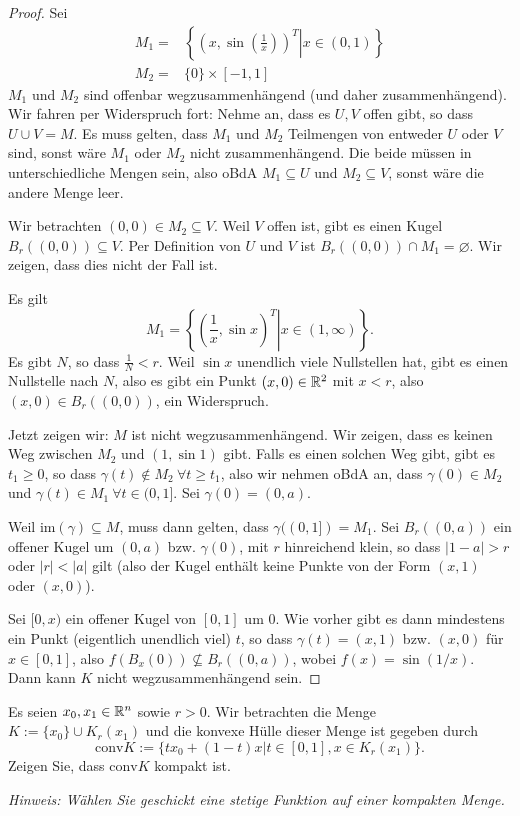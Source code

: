 \begin{proof}
	Sei
	\begin{align*}
		M_1=&\left\{ \left.\left( x,\sin\left( \frac{1}{x} \right)\right)^T \right|x\in (0,1)   \right\}\\
			M_2=& \{0\} \times [-1,1]\
	\end{align*}
	$M_1$ und $M_2$ sind offenbar wegzusammenhängend (und daher zusammenhängend). Wir fahren per Widerspruch fort: Nehme an, dass es $U,V$ offen gibt, so dass $U\cup V=M$. Es muss gelten, dass $M_1$ und $M_2$ Teilmengen von entweder $U$ oder $V$ sind, sonst wäre $M_1$ oder $M_2$ nicht zusammenhängend. Die beide müssen in unterschiedliche Mengen sein, also oBdA $M_1\subseteq U$ und $M_2\subseteq V$, sonst wäre die andere Menge leer.

	Wir betrachten $(0,0)\in M_2\subseteq V$. Weil $V$ offen ist, gibt es einen Kugel $B_r((0,0))\subseteq V$. Per Definition von $U$ und $V$ ist $B_r((0,0))\cap M_1=\varnothing$. Wir zeigen, dass dies nicht der Fall ist.
	
	Es gilt
	\[
	M_1=\left\{\left.\left( \frac{1}{x},\sin x \right)^T\right| x\in (1,\infty) \right\} 
	.\] 
	Es gibt $N$, so dass $\frac{1}{N}<r$. Weil $\sin x$ unendlich viele Nullstellen hat, gibt es einen Nullstelle nach $N$, also es gibt ein Punkt $(x,0)\in \mathbb{R}^2$ mit $x<r$, also $(x,0)\in B_r((0,0))$, ein Widerspruch.

	Jetzt zeigen wir: $M$ ist nicht wegzusammenhängend. Wir zeigen, dass es keinen Weg zwischen $M_2$ und $(1,\sin 1)$ gibt. Falls es einen solchen Weg gibt, gibt es $t_1\ge 0$, so dass $\gamma(t)\not\in M_2~\forall t\ge t_1$, also wir nehmen oBdA an, dass $\gamma(0)\in M_2$ und $\gamma(t)\in M_1~\forall t\in (0,1]$. Sei $\gamma(0)=(0,a)$.  

	Weil $\text{im}(\gamma)\subseteq M$, muss dann gelten, dass $\gamma((0,1])=M_1$. Sei $B_r((0,a))$ ein offener Kugel um $(0,a)$ bzw. $\gamma(0)$, mit $r$ hinreichend klein, so dass $|1-a|>r$ oder $|r|<|a|$ gilt (also der Kugel enthält keine Punkte von der Form $(x,1)$ oder $(x,0)$).

	Sei $[0,x)$ ein offener Kugel von $[0,1]$ um $0$. Wie vorher gibt es dann mindestens ein Punkt (eigentlich unendlich viel) $t$, so dass $\gamma(t)=(x,1)$ bzw. $(x,0)$ f\"{u}r $x\in [0,1]$, also $f(B_x(0))\not\subseteq B_r((0,a))$, wobei $f(x)=\sin(1 / x)$. Dann kann $K$ nicht wegzusammenhängend sein.
\end{proof}
\begin{Problem}
	Es seien $x_0,x_1\in \mathbb{R}^n$ sowie $r>0$. Wir betrachten die Menge $K:=\{x_0\} \cup K_r(x_1)$ und die konvexe Hülle dieser Menge ist gegeben durch
	\[
		\text{conv}K:=\{tx_0+(1-t)x|t\in [0,1],x\in K_r(x_1)\} 
	.\] 
	Zeigen Sie, dass $\text{conv}K$ kompakt ist.

	{\footnotesize\emph{Hinweis: Wählen Sie geschickt eine stetige Funktion auf einer kompakten Menge.}} 
\end{Problem}
